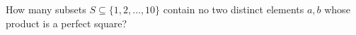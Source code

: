 How many subsets $S\subseteq\{1,2,\ldots,10\}$ contain no two distinct elements $a,b$ whose product is a perfect square?
